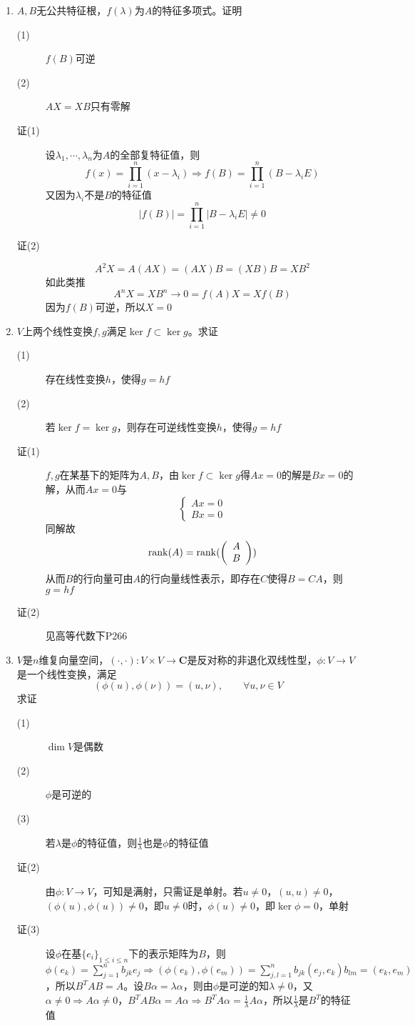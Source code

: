 \begin{enumerate}
\item $A,B$无公共特征根，$f(\lambda)$为$A$的特征多项式。证明
\begin{description}
\item[(1)] $f(B)$可逆
\item[(2)] $AX=XB$只有零解
\item[证(1)] 设$\lambda_1,\cdots,\lambda_n$为$A$的全部复特征值，则
\[
f(x) = \prod_{i=1}^n(x-\lambda_i) \Rightarrow f(B) = \prod_{i=1}^n(B-\lambda_iE)
\]
又因为$\lambda_i$不是$B$的特征值
\[
|f(B)| = \prod_{i=1}^n|B-\lambda_iE| \neq 0
\]
\item[证(2)]
\[
A^2X = A(AX)=(AX)B = (XB)B = XB^2
\]
如此类推
\[
A^nX=XB^n \rightarrow 0 = f(A)X = Xf(B)
\]
因为$f(B)$可逆，所以$X=0$
\end{description}

\item $V$上两个线性变换$f,g$满足$\ker f \subset \ker g$。求证
\begin{description}
\item[(1)] 存在线性变换$h$，使得$g=hf$
\item[(2)] 若$\ker f=\ker g$，则存在可逆线性变换$h$，使得$g=hf$
\item[证(1)] $f,g$在某基下的矩阵为$A,B$，由$\ker f \subset \ker g$得$Ax=0$的解是$Bx=0$的解，从而$Ax=0$与
\[
\begin{cases}
Ax=0 \\
Bx=0 
\end{cases}
\]同解故
\[
\operatorname{rank}(A) = \operatorname{rank}( \left(
\begin{array}{c}
A\\
B
\end{array}
\right) )
\]
从而$B$的行向量可由$A$的行向量线性表示，即存在$C$使得$B=CA$，则$g=hf$
\item[证(2)] 见高等代数下P266
\end{description}

\item $V$是$n$维复向量空间，$(\cdot , \cdot):V\times V\rightarrow \mathbf{C}$是反对称的非退化双线性型，$\phi:V\rightarrow V$是一个线性变换，满足
\[
(\phi(u),\phi(\nu))=(u,\nu),\qquad \forall u,\nu \in V
\]
求证
\begin{description}
\item[(1)] $\dim V$是偶数
\item[(2)] $\phi$是可逆的
\item[(3)] 若$\lambda$是$\phi$的特征值，则$\frac{1}{\lambda}$也是$\phi$的特征值
\item[证(2)] 由$\phi:V\rightarrow V$，可知是满射，只需证是单射。若$u\neq 0$，$(u,u)\neq 0$，$(\phi(u),\phi(u))\neq 0$，即$u\neq 0$时，$\phi(u)\neq 0$，即$\ker \phi={0}$，单射
\item[证(3)] 设$\phi$在基$\{e_i\}_{1\leq i\leq n}$下的表示矩阵为$B$，则$\phi(e_k)=\sum_{j=1}^nb_{jk}e_j \Rightarrow(\phi(e_k),\phi(e_m))=\sum_{j,l=1}^nb_{jk}(e_j,e_k)b_{lm}=(e_k,e_m)$，所以$B^TAB=A$。设$B\alpha=\lambda\alpha$，则由$\phi$是可逆的知$\lambda\neq 0$，又$\alpha \neq 0 \Rightarrow A\alpha \neq 0$，$B^TAB\alpha = A\alpha \Rightarrow B^TA\alpha = \frac{1}{\lambda}A\alpha$，所以$\frac{1}{\lambda}$是$B^T$的特征值
\end{description}
\end{enumerate}